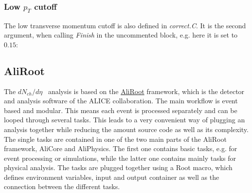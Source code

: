\documentclass{article}
\newcommand\dNdEta{$dN_{ch}/d\eta$}
\begin{document}
\subsubsection*{Low $p_{T}$ cutoff}
The low transverse momentum cutoff is also defined in \textit{correct.C}. It is the second argument, when calling \textit{Finish} in the uncommented block, e.g. here it is set to $0.15$:


\subsection{AliRoot}
The \dNdEta~ analysis is based on the \href{http://aliweb.cern.ch/Offline/AliRoot/Manual.html}{AliRoot} framework, which is the detector and analysis software of the ALICE collaboration. The main workflow is event based and modular. This means each event is processed separately and can be looped through several tasks. This leads to a very convenient way of plugging an analysis together while reducing the amount source code as well as its complexity. The single tasks are contained in one of the two main parts of the AliRoot framework, AliCore and AliPhysics. The first one contains basic tasks, e.g. for event processing or simulations, while the latter one contains mainly tasks for physical analysis. The tasks are plugged together using a Root macro, which defines environment variables, input and output container as well as the connection between the different tasks.\\
\end{document}
